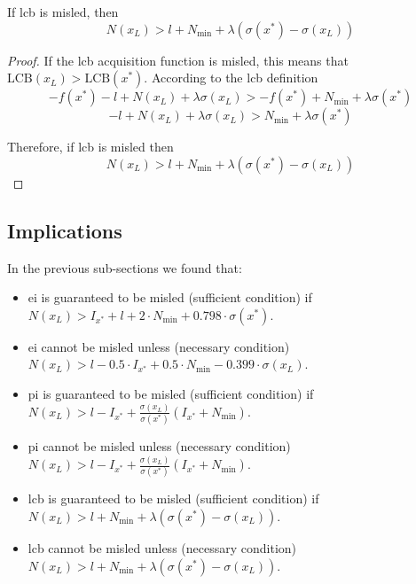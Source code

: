 \begin{theorem}
If \gls{lcb} is misled, then
\begin{equation*}
    N(x_L) > l + N_{\min} + \lambda (\sigma(x^*) - \sigma(x_L))
\end{equation*}

\end{theorem}

\begin{proof}
If the \gls{lcb} acquisition function is misled, this means that $\mathrm{LCB}(x_L) > \mathrm{LCB}(x^*)$. According to the \gls{lcb} definition
\begin{equation*}
    - f(x^*) - l + N(x_L) + \lambda \sigma(x_L) > - f(x^*) + N_{\min} + \lambda \sigma(x^*)
\end{equation*}
\begin{equation*}
   - l + N(x_L) + \lambda \sigma(x_L) > N_{\min} + \lambda \sigma(x^*)
\end{equation*}

Therefore, if \gls{lcb} is misled then
\begin{equation*}
    N(x_L) > l + N_{\min} + \lambda (\sigma(x^*) - \sigma(x_L))
\end{equation*}
\end{proof}

\subsection{Implications}
In the previous sub-sections we found that:
\begin{itemize}
    \item \gls{ei} is guaranteed to be misled (sufficient condition) if $N(x_L) > I_{x^*} + l + 2 \cdot N_{\min} + 0.798 \cdot \sigma(x^*)$.
    \item \gls{ei} cannot be misled unless (necessary condition) $N(x_L) > l - 0.5 \cdot I_{x^*} + 0.5 \cdot N_{\min} - 0.399 \cdot \sigma(x_L)$.
    \item \gls{pi} is guaranteed to be misled (sufficient condition) if $N(x_L) > l - I_{x^*} + \frac{\sigma(x_L)}{\sigma(x^*)} (I_{x^*} + N_{\min})$.
    \item \gls{pi} cannot be misled unless (necessary condition) $N(x_L) > l - I_{x^*} + \frac{\sigma(x_L)}{\sigma(x^*)} (I_{x^*} + N_{\min})$.
    \item \gls{lcb} is guaranteed to be misled (sufficient condition) if $N(x_L) > l + N_{\min} + \lambda (\sigma(x^*) - \sigma(x_L))$.
    \item \gls{lcb} cannot be misled unless (necessary condition) $N(x_L) > l + N_{\min} + \lambda (\sigma(x^*) - \sigma(x_L))$.
\end{itemize}

